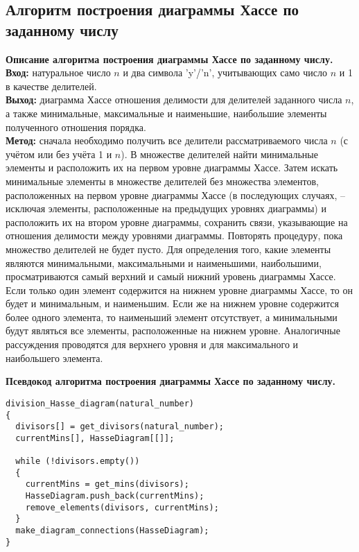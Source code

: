 \documentclass[spec, och, otchet, hidelinks]{SCWorks}
\begin{document}
\newpage

\subsection{Алгоритм построения диаграммы Хассе по заданному числу}

\par \textbf{Описание алгоритма построения диаграммы Хассе по заданному числу.} \\
\textbf{Вход:} натуральное число $n$ и два символа 'y'/'n', учитывающих само
число $n$ и 1 в качестве делителей. \\
\textbf{Выход:} диаграмма Хассе отношения делимости для делителей заданного
числа $n$, а также минимальные, максимальные и наименьшие, наибольшие элементы
полученного отношения порядка. \\
\textbf{Метод:} сначала необходимо получить все делители рассматриваемого числа
$n$ (с учётом или без учёта 1 и $n$). В множестве делителей найти минимальные
элементы и расположить их на первом уровне диаграммы Хассе. Затем искать
минимальные элементы в множестве делителей без множества элементов,
расположенных на первом уровне диаграммы Хассе (в последующих случаях, --
исключая элементы, расположенные на предыдущих уровнях диаграммы) и расположить
их на втором уровне диаграммы, сохранить связи, указывающие на отношения делимости
между уровнями диаграммы. Повторять процедуру, пока множество делителей не будет
пусто. Для определения того, какие элементы являются минимальными, максимальными и
наименьшими, наибольшими, просматриваются самый верхний и самый нижний уровень
диаграммы Хассе. Если только один элемент содержится на нижнем
уровне диаграммы Хассе, то он будет и минимальным, и наименьшим. Если же на
нижнем уровне содержится более одного элемента, то наименьший элемент 
отсутствует, а минимальными будут являться все элементы, расположенные на
нижнем уровне. Аналогичные рассуждения проводятся для верхнего уровня и для
максимального и наибольшего элемента.\\

\par \textbf{Псевдокод алгоритма построения диаграммы Хассе по заданному числу.}

\begin{lstlisting}[caption=Псевдокод алгоритма., mathescape]
division_Hasse_diagram(natural_number)
{
  divisors[] = get_divisors(natural_number);
  currentMins[], HasseDiagram[[]];
  
  while (!divisors.empty())
  {
    currentMins = get_mins(divisors);
    HasseDiagram.push_back(currentMins);
    remove_elements(divisors, currentMins);
  }
  make_diagram_connections(HasseDiagram);
}
\end{lstlisting}
\end{document}

